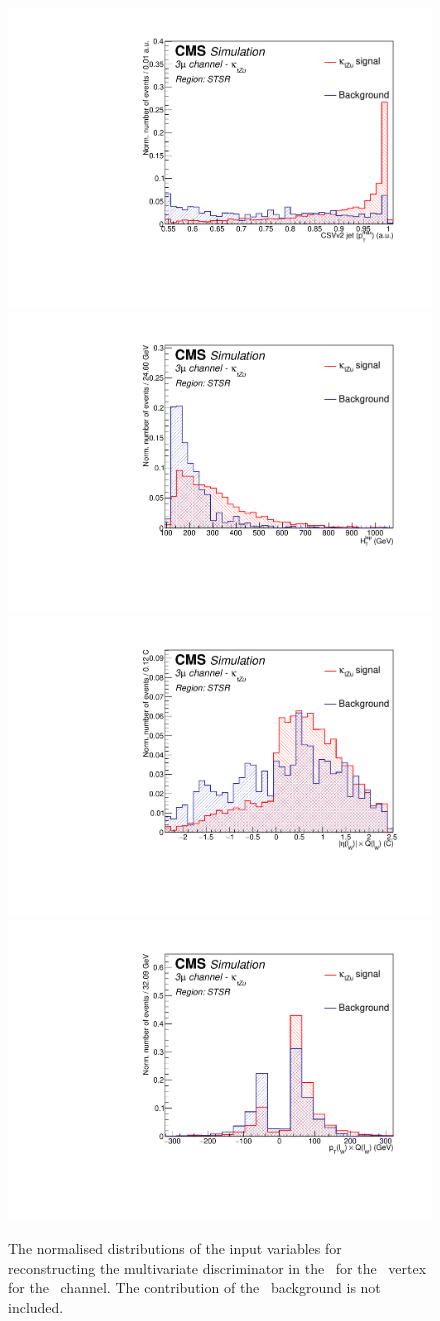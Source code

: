 \begin{figure}[htbp]
	\includegraphics[width=0.3\linewidth]{6_Search/Figures/PlotsTechnics/bdiscCSVv2_jet_0Zutsingletopuuu_norm}
		\includegraphics[width=0.3\linewidth]{6_Search/Figures/PlotsTechnics/TotalHt_lepZutsingletopuuu_norm}
	\includegraphics[width=0.3\linewidth]{6_Search/Figures/PlotsTechnics/charge_asymZutsingletopuuu_norm}
			\includegraphics[width=0.3\linewidth]{6_Search/Figures/PlotsTechnics/ptWQZutsingletopuuu_norm}
	\caption{The normalised distributions of the input variables for reconstructing the multivariate discriminator in the \STSR\ for the \Zut\ vertex for the \mumumu\ channel. The contribution of the \NPL\ background is not included. }
	\label{fig:singletopZutnormalized}
\end{figure}
